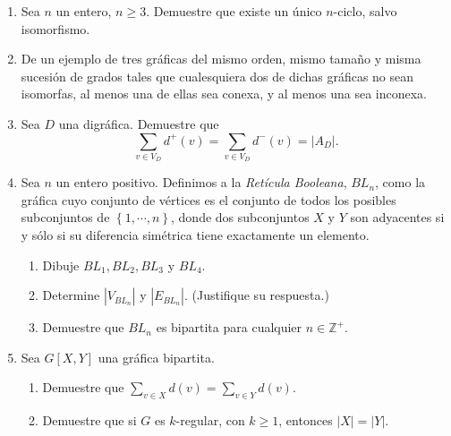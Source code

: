 \documentclass{article}
\newcommand{\set}[1]{%
\left\{ #1 \right\}%
}
\begin{document}
\begin{enumerate}
  \item Sea $n$ un entero, $n \ge 3$.   Demuestre que existe un \'unico
    $n$-ciclo, salvo isomorfismo.
  \item De un ejemplo de tres gr\'aficas del mismo orden, mismo tama\~no y misma
    sucesi\'on de grados tales que cualesquiera dos de dichas gr\'aficas no sean
    isomorfas, al menos una de ellas sea conexa, y al menos una sea inconexa.
  \item Sea $D$ una digr\'afica.   Demuestre que
    $$\sum_{v \in V_D} d^+(v) = \sum_{v \in V_D} d^-(v) = |A_D|.$$
  \item  Sea $n$ un entero positivo. Definimos a la {\em Ret\'icula Booleana},
    $BL_n$, como la gr\'afica cuyo conjunto de vértices es el conjunto de todos
    los posibles subconjuntos de $\set{1, \cdots, n}$, donde dos subconjuntos
    $X$ y $Y$ son adyacentes si y s\'olo si su diferencia sim\'etrica tiene
    exactamente un elemento.
    \begin{enumerate}
      \item Dibuje $BL_1, BL_2, BL_3$ y $BL_4$.

      \item Determine $|V_{BL_n}|$ y $|E_{BL_n}|$. (Justifique su respuesta.)

      \item Demuestre que $BL_n$ es bipartita para cualquier $n \in
        \mathbb{Z}^+$.
    \end{enumerate}

  \item Sea $G[X, Y]$ una gr\'afica bipartita.
    \begin{enumerate}
      \item Demuestre que $\sum_{v \in X} d(v) = \sum_{v \in Y} d(v)$.

      \item Demuestre que si $G$ es $k$-regular, con $k \ge 1$, entonces $|X| =
        |Y|$.
    \end{enumerate}

\end{enumerate}
\end{document}
